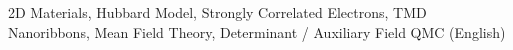 \begin{keywords}
\acs{2D} Materials, Hubbard Model, Strongly Correlated Electrons, \acl{TMD} Nanoribbons, Mean Field Theory, Determinant / Auxiliary Field \acf{QMC} (English)
\end{keywords}
\clearpage
\thispagestyle{empty}
\cleardoublepage